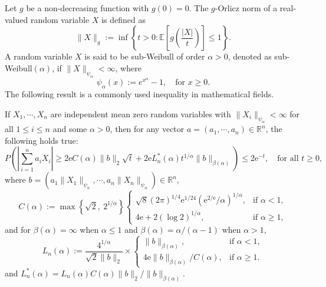 \documentclass{article}
\begin{document}
Let \(g\) be a non-decreasing function with \(g(0) = 0\). The \(g\)-Orlicz norm of a real-valued random variable \(X\) is defined as
\begin{equation*}
    \|X\|_g := \inf \left\{ t > 0 : \mathbb{E} \left[ g \left( \frac{|X|}{t} \right) \right] \leq 1 \right\}.
\end{equation*}
A random variable \(X\) is said to be sub-Weibull of order \(\alpha > 0\), denoted as sub-Weibull\((\alpha)\), if \(\|X\|_{\psi_\alpha} < \infty\), where
\begin{equation*}
    \psi_\alpha(x) := e^{x^\alpha} - 1, \quad \text{for } x \geq 0.
\end{equation*}
The following result is a commonly used inequality in mathematical fields.

If \(X_1, \cdots, X_n\) are independent mean zero random variables with \(\|X_i\|_{\psi_\alpha}<\infty\) for all \(1 \leq i \leq n\) and some \(\alpha > 0\), then for any vector \(a = (a_1, \cdots, a_n) \in \mathbb{R}^n\), the following holds true:
\begin{equation}
    P\left(\left|\sum_{i=1}^{n} a_i X_i\right| \geq 2\mathrm{e}C(\alpha)\|b\|_2\sqrt{t} + 2\mathrm{e}L_n^{*}(\alpha)t^{1/\alpha}\|b\|_{\beta(\alpha)}\right) \leq 2\mathrm{e}^{-t},\quad \text{for all } t \geq 0,\label{eq:consen_ineq}
\end{equation}
where \(b = (a_1\|X_1\|_{\psi_\alpha}, \cdots, a_n\|X_n\|_{\psi_\alpha}) \in \mathbb{R}^n\),
\begin{equation*}
    C(\alpha) := \max\left\{\sqrt{2},~2^{1/\alpha}\right\}
    \begin{cases}
        \sqrt{8}(2\pi)^{1/4}\mathrm{e}^{1/24}(\mathrm{e}^{2/\mathrm{e}}/\alpha)^{1/\alpha}, & \text{if } \alpha < 1,\\
        4\mathrm{e}+2(\log 2)^{1/\alpha}, & \text{if } \alpha\geq 1,
    \end{cases}
\end{equation*}
and for \(\beta(\alpha) = \infty\) when \(\alpha \leq 1\) and \(\beta(\alpha) = \alpha/(\alpha-1)\) when \(\alpha > 1\),
\begin{equation*}
    L_n(\alpha) := \frac{4^{1/\alpha}}{\sqrt{2}\|b\|_2} \times
    \begin{cases}
        \|b\|_{\beta(\alpha)}, & \text{if } \alpha<1,\\
        4\mathrm{e}\|b\|_{\beta(\alpha)}/C(\alpha), & \text{if } \alpha\geq 1.
    \end{cases}
\end{equation*}
and \(L_n^{*}(\alpha) = L_n(\alpha) C(\alpha)\|b\|_2/\|b\|_{\beta(\alpha)}\).
\end{document}
